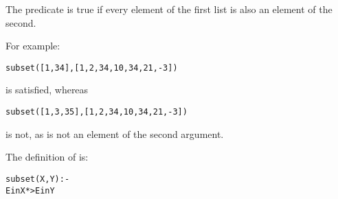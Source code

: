 The  predicate is true if every element of the first list is also an element of the second.

For example:
\begin{alltt}
subset([1,34],[1,2,34,10,34,21,-3])
\end{alltt}
is satisfied, whereas
\begin{alltt}
subset([1,3,35],[1,2,34,10,34,21,-3])
\end{alltt}
is not, as  is not an element of the second argument.

The definition of  is:
\begin{alltt}
subset(X,Y) :-
  E in X *> E in Y
\end{alltt}

